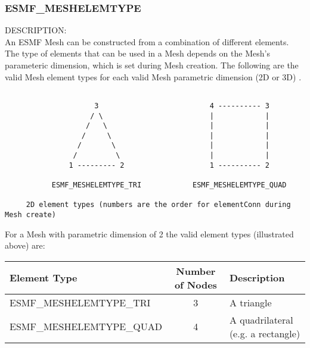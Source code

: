 
\subsubsection{ESMF\_MESHELEMTYPE}
\label{const:meshelemtype}

 {\sf DESCRIPTION:\\}
 An ESMF Mesh can be constructed from a combination of different elements. The type of elements that can
be used in a Mesh depends on the Mesh's parameteric dimension, which is set during Mesh creation. The
following are the valid Mesh element types for each valid Mesh parametric dimension (2D or 3D) .

\medskip

\begin{verbatim}

                     3                          4 ---------- 3
                    / \                         |            |  
                   /   \                        |            |
                  /     \                       |            |
                 /       \                      |            |
                /         \                     |            |
               1 --------- 2                    1 ---------- 2

           ESMF_MESHELEMTYPE_TRI            ESMF_MESHELEMTYPE_QUAD

     2D element types (numbers are the order for elementConn during Mesh create)

\end{verbatim}

For a Mesh with parametric dimension of 2 the valid element types (illustrated above) are:

\smallskip

\begin{tabular}{|l|c|l|}
\hline
Element Type &  Number of Nodes  & Description \\
\hline
ESMF\_MESHELEMTYPE\_TRI  & 3 & A triangle \\
ESMF\_MESHELEMTYPE\_QUAD & 4 & A quadrilateral (e.g. a rectangle) \\
\hline
\end{tabular}

\medskip
\medskip

